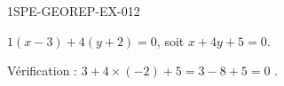 \begin{corrige}{1SPE-GEOREP-EX-012}


$1(x - 3) + 4(y + 2) = 0$, soit $x + 4y + 5 = 0$.

Vérification : $3 + 4 \times (-2) + 5 = 3 - 8 + 5 = 0$ \checkmark.

\end{corrige}
